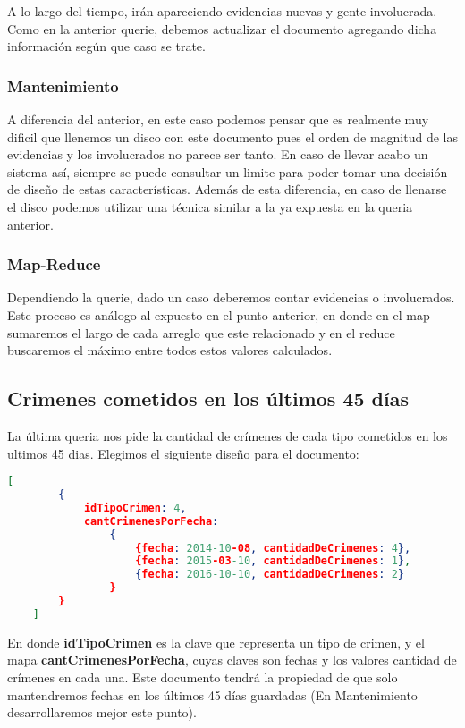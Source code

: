 \documentclass[11pt, a4paper]{article}
\begin{document}
A lo largo del tiempo, ir\'an apareciendo evidencias nuevas y gente involucrada. Como en la anterior querie, debemos actualizar el documento agregando dicha informaci\'on seg\'un que caso se trate.

\subsubsection{Mantenimiento}

A diferencia del anterior, en este caso podemos pensar que es realmente muy dificil que llenemos un disco con este documento pues el orden de magnitud de las evidencias y los involucrados no parece ser tanto. En caso de llevar acabo un sistema as\'i, siempre se puede consultar un limite para poder tomar una decisi\'on de dise\~no de estas caracter\'isticas. Adem\'as de esta diferencia, en caso de llenarse el disco podemos utilizar una t\'ecnica similar a la ya expuesta en la queria anterior.

\subsubsection{Map-Reduce}

Dependiendo la querie, dado un caso deberemos contar evidencias o involucrados. Este proceso es an\'alogo al expuesto en el punto anterior, en donde en el map sumaremos el largo de cada arreglo que este relacionado y en el reduce buscaremos el m\'aximo entre todos estos valores calculados.

\subsection{Crimenes cometidos en los \'ultimos 45 d\'ias}

La \'ultima queria nos pide la cantidad de cr\'imenes de cada tipo cometidos en los ultimos 45 dias. Elegimos el siguiente dise\~no para el documento:

\begin{lstlisting}[language=json]
	[
		{
			idTipoCrimen: 4,
			cantCrimenesPorFecha:
				{
					{fecha: 2014-10-08, cantidadDeCrimenes: 4},
					{fecha: 2015-03-10, cantidadDeCrimenes: 1},
					{fecha: 2016-10-10, cantidadDeCrimenes: 2}
				}
		}
	]
\end{lstlisting}

En donde \textbf{idTipoCrimen} es la clave que representa un tipo de crimen, y el mapa \textbf{cantCrimenesPorFecha}, cuyas claves son fechas y los valores cantidad de cr\'imenes en cada una. Este documento tendr\'a la propiedad de que solo mantendremos fechas en los \'ultimos 45 d\'ias guardadas (En Mantenimiento desarrollaremos mejor este punto).
\end{document}
